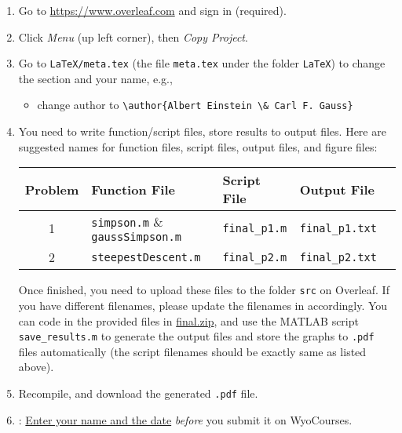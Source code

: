 \begin{enumerate}[label={\arabic*.}]
  \item Go to \url{https://www.overleaf.com} and sign in (required).
  \item Click \emph{Menu} (up left corner), then \emph{Copy Project}.
  \item Go to \verb|LaTeX/meta.tex| (the file \verb|meta.tex| under the folder \verb|LaTeX|) to change the section and your name, e.g.,
    \begin{itemize}
      \item change author to \verb|\author{Albert Einstein \& Carl F. Gauss}|
    \end{itemize}
  \item You need to write function/script files, store results to output files. Here are suggested names for function files, script files, output files, and figure files:
    \begin{table}[!hbtp]
      \centering
      \begin{tabular}{cllll}
        \toprule
        Problem & Function File                              & Script File       & Output File         \\
        \midrule
        1       & \verb|simpson.m| \&  \verb|gaussSimpson.m| & \verb|final_p1.m| & \verb|final_p1.txt| \\
        2       & \verb|steepestDescent.m|                   & \verb|final_p2.m| & \verb|final_p2.txt| \\
        \bottomrule
      \end{tabular}
    \end{table}

    Once finished, you need to upload these files to the folder \verb|src| on Overleaf. If you have different filenames, please update the filenames in \verb|| accordingly. You can code in the provided files in \href{https://libaoj.in/courses/2020s/MATH3340/Homework/9/final.zip}{final.zip}, and use the MATLAB script \verb|save_results.m| to generate the output files and store the graphs to \verb|.pdf| files automatically (the script filenames should be exactly same as listed above).
  \item Recompile, and download the generated \verb|.pdf| file.
  \item \textbf{\color{red}{Important}}: \underline{Enter your name and the date} \emph{before} you submit it on WyoCourses.
\end{enumerate}

